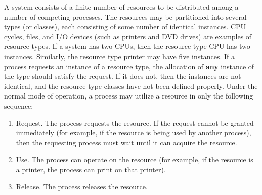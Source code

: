 A system consists of a finite number of resources to be distributed among a number of competing processes.
The resources may be partitioned into several types (or classes), each consisting of some number of identical instances.
CPU cycles, files, and I/O devices (such as printers and DVD drives) are examples of resource types.
If a system has two CPUs, then the resource type CPU has two instances.
Similarly, the resource type printer may have five instances.
If a process requests an instance of a resource type, the allocation of \textbf{any} instance of the type should satisfy the request.
If it does not, then the instances are not identical, and the resource type classes have not been defined properly.
Under the normal mode of operation, a process may utilize a resource in only the following sequence:
\begin{enumerate}[noitemsep]
\item Request.
  The process requests the resource.
  If the request cannot be granted immediately (for example, if the resource is being used by another process), then the requesting process must wait until it can acquire the resource.
\item Use.
  The process can operate on the resource (for example, if the resource is a printer, the process can print on that printer).
\item Release.
  The process releases the resource.
\end{enumerate}

